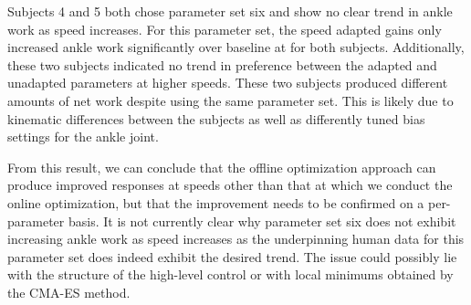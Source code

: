 Subjects 4 and 5 both chose parameter set six and show no clear trend in ankle
work as speed increases. For this parameter set, the speed adapted gains only
increased ankle work significantly over baseline at  for
both subjects. Additionally, these two subjects indicated no trend in
preference between the adapted and unadapted parameters at higher speeds.
These two subjects produced different amounts of net work despite using the same
parameter set. This is likely due to kinematic differences between the subjects
as well as differently tuned bias settings for the ankle joint.

From this result, we can conclude that the offline optimization approach can
produce improved responses at speeds other than that at which we conduct the
online optimization, but that the improvement needs to be confirmed on a
per-parameter basis. It is not currently clear why parameter set six does not
exhibit increasing ankle work as speed increases as the underpinning human data
for this parameter set does indeed exhibit the desired trend. The issue could
possibly lie with the structure of the high-level control or with local minimums
obtained by the CMA-ES method. 

